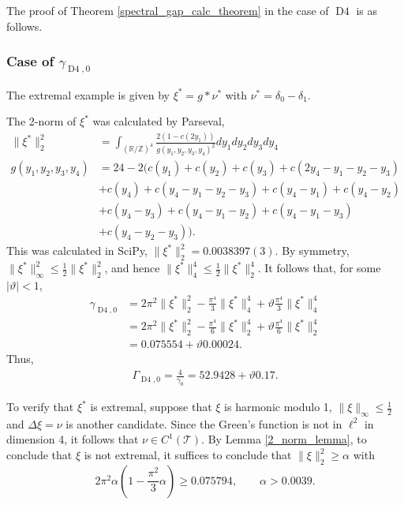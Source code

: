 \documentclass[a4paper, 12pt, notitlepage]{amsart}
\newcommand{\Dfour}{\operatorname{D4}}
\newcommand{\bR}{\mathbb{R}}
\newcommand{\zed}{\mathbb{Z}}
\newcommand{\sT}{\mathscr{T}}
\theoremstyle{remark}
\begin{document}
The proof of Theorem \ref{spectral_gap_calc_theorem} in the case of $\Dfour$ is as follows.
\subsubsection*{Case of $\gamma_{\Dfour, 0}$}
The extremal example is given by $\xi^* = g* \nu^*$ with $\nu^* = \delta_0 - \delta_{1}$. 

The 2-norm of $\xi^*$ was calculated by Parseval,
\begin{align*}
 \|\xi^*\|_2^2 &= \int_{(\bR/\zed)^4} \frac{2(1 - c(2y_1))}{g(y_1, y_2, y_3, y_4)^2}dy_1dy_2dy_3dy_4\\
 g(y_1, y_2, y_3, y_4) &= 24 - 2(c(y_1) + c(y_2) + c(y_3) + c(2y_4 - y_1-y_2-y_3)\\& + c(y_4) + c(y_4-y_1-y_2-y_3) + c(y_4-y_1) + c(y_4-y_2)\\& + c(y_4-y_3) + c(y_4 - y_1-y_2) + c(y_4-y_1-y_3)\\& + c(y_4-y_2-y_3) ) .
\end{align*}
This was calculated in SciPy, $\|\xi^*\|_2^2 = 0.0038397(3).$  By symmetry, $\|\xi^*\|_\infty^2 \leq \frac{1}{2} \|\xi^*\|_2^2$, and hence $\|\xi^*\|_4^4 \leq \frac{1}{2}\|\xi^*\|_2^4$. It follows that, for some $|\vartheta|< 1$, 
\begin{align*}
\gamma_{\Dfour,0}&= 2\pi^2 \|\xi^*\|_2^2 - \frac{\pi^4}{3}\|\xi^*\|_4^4 + \vartheta\frac{\pi^4}{3}\|\xi^*\|_4^4\\
 &= 2\pi^2 \|\xi^*\|_2^2 - \frac{\pi^4}{6} \|\xi^*\|_2^4 + \vartheta\frac{\pi^4}{6} \|\xi^*\|_2^4\\
 &= 0.075554+ \vartheta 0.00024.
\end{align*}
Thus,
\begin{align*}
 \Gamma_{\Dfour,0} = \frac{4}{\gamma_0} = 52.9428 + \vartheta 0.17.
\end{align*}

To verify that $\xi^*$ is extremal, suppose that $\xi$ is harmonic modulo 1, $\|\xi\|_\infty \leq \frac{1}{2}$ and $\Delta \xi = \nu$ is another candidate.  Since the Green's function is not in $\ell^2$ in dimension 4, it follows that $\nu \in C^1(\sT)$.  By Lemma \ref{2_norm_lemma}, to conclude that $\xi$ is not extremal, it suffices to conclude that $\|\xi\|_2^2 \geq \alpha$ with
\begin{equation}
 2\pi^2 \alpha\left(1 - \frac{\pi^2}{3}\alpha \right) \geq 0.075794, \qquad \alpha >0.0039. 
\end{equation}
\end{document}
